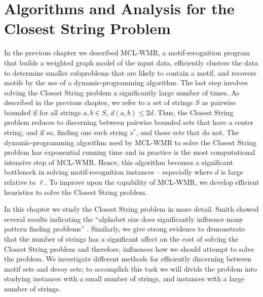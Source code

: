 \chapter{Algorithms and Analysis for the {\sc Closest String} Problem}\label{chapter:closest_string_problem}

In the previous chapter we described MCL-WMR, a motif-recognition program that builds a weighted graph model of the input data, efficiently clusters the data to determine smaller subproblems that are likely to contain a motif, and recovers motifs by the use of a dynamic-programming algorithm.  The last step involves solving the {\sc Closest String} problem a significantly large number of times.  As described in the previous chapter, we refer to a set of strings $S$ as pairwise bounded if for all strings $a, b \in S$, $d(a,b) \leq 2d$.  Thus, the {\sc Closest String} problem reduces to discerning between pairwise bounded sets that have a center string, and if so, finding one such string $s^*$, and those sets that do not. The dynamic-programming algorithm used by MCL-WMR to solve the {\sc Closest String} problem has exponential running time and in practice is the most computational intensive step of MCL-WMR. Hence, this algorithm becomes a significant bottleneck in solving motif-recognition instances -- especially where $d$ is large relative to $\ell$. To improve upon the capability of MCL-WMR, we develop efficient heuristics to solve the {\sc Closest String} problem.  

In this chapter we study the {\sc Closest String} problem in more detail.  Smith showed several results indicating the ``alphabet size does significantly influence many pattern finding problems''  \cite[p. 51]{asmith}.   Similarly, we give strong evidence to demonstrate that the number of strings has a significant affect on the cost of solving the {\sc Closest String} problem and therefore, influences how we should attempt to solve the problem.  We investigate different methods for efficiently discerning between motif sets and decoy sets; to accomplish this task we will divide the problem into studying instances with a small number of strings, and instances with a large number of strings. 
  
